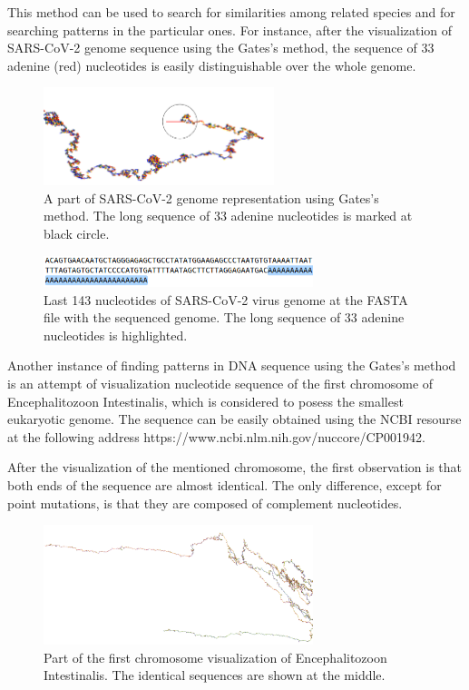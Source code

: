 This method can be used to search for similarities among related species and for searching patterns in the particular ones.
For instance, after the visualization of SARS-CoV-2 genome sequence using the Gates's method, the sequence of 33 adenine (red) nucleotides is easily distinguishable over the whole genome.
\begin{figure}[!ht]
	\centering
	\includegraphics[width=0.6\textwidth]{figures/aaaaa.png}
	\caption{A part of SARS-CoV-2 genome representation using Gates's method. The long sequence of 33 adenine nucleotides is marked at black circle.\label{o:latex_friendly_zone}}
\end{figure}

\begin{figure}[!ht]
	\centering
	\includegraphics[width=0.7\textwidth]{figures/AAAA.png}
	\caption{Last 143 nucleotides of SARS-CoV-2 virus genome at the FASTA file with the sequenced genome. The long sequence of 33 adenine nucleotides is highlighted.\label{o:latex_friendly_zone}}
\end{figure}

Another instance of finding patterns in DNA sequence using the Gates's method is an attempt of visualization nucleotide sequence of the first chromosome of Encephalitozoon Intestinalis, which is considered to posess the smallest eukaryotic genome.
The sequence can be easily obtained using the NCBI resourse at the following address https://www.ncbi.nlm.nih.gov/nuccore/CP001942.

After the visualization of the mentioned chromosome, the first observation is that both ends of the sequence are almost identical. %
The only difference, except for point mutations, is that they are composed of complement nucleotides.

\begin{figure}[!ht]
	\centering
	\includegraphics[width=0.7\textwidth]{figures/gateseu.png}
	\caption{Part of the first chromosome visualization of Encephalitozoon Intestinalis. The identical sequences are shown at the middle.\label{o:latex_friendly_zone}}
\end{figure}

